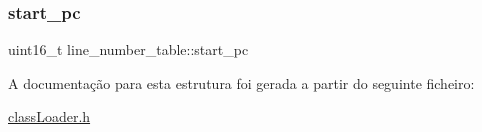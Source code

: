 \subsubsection{\texorpdfstring{start\+\_\+pc}{start\_pc}}
{\footnotesize\ttfamily uint16\+\_\+t line\+\_\+number\+\_\+table\+::start\+\_\+pc}



A documentação para esta estrutura foi gerada a partir do seguinte ficheiro\+:\begin{DoxyCompactItemize}
\item 
\hyperlink{class_loader_8h}{class\+Loader.\+h}\end{DoxyCompactItemize}
